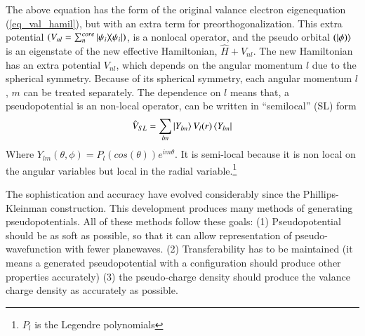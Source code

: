 The above equation has the form of the original valance electron eigenequation (\ref{eq_val_hamil}), but with an extra term for preorthogonalization. This extra potential $(V_{nl} = \sum_n^{core} \dyad{\psi_i}{\psi_i})$, is a nonlocal operator, and the pseudo orbital $(\ket{\phi)}$ is an eigenstate of the new effective Hamiltonian, $\hat{H} + V_{nl}$. The new Hamiltonian has an extra potential $V_{nl}$, which depends on the angular momentum $l$ due to the spherical symmetry. Because of its spherical symmetry, each angular momentum $l$, $m$ can be treated separately. The dependence on $l$ means that, a pseudopotential is an non-local operator, can be written in ``semilocal'' (SL) form
\begin{equation}
\label{eq_sl}
\hat{V}_{SL} = \sum_{lm} \ket{Y_{lm}}V_l(r)\bra{Y_{lm}}
\end{equation}
Where $Y_{lm}(\theta,\phi) = P_l(cos(\theta))e^{im\theta}$. It is semi-local because it is non local on the angular variables but local in the radial variable.\footnote{$P_l$ is the Legendre polynomials}


The sophistication and accuracy have evolved considerably since the Phillips-Kleinman construction. This development produces many methods of generating pseudopotentials. All of these methods follow these goals: (1) Pseudopotential should be as soft as possible, so that it can allow representation of pseudo-wavefunction with fewer planewaves. (2) Transferability has to be maintained (it means a generated pseudopotential with a configuration should produce other properties accurately) (3) the pseudo-charge density should produce the valance charge density as accurately as possible. 


